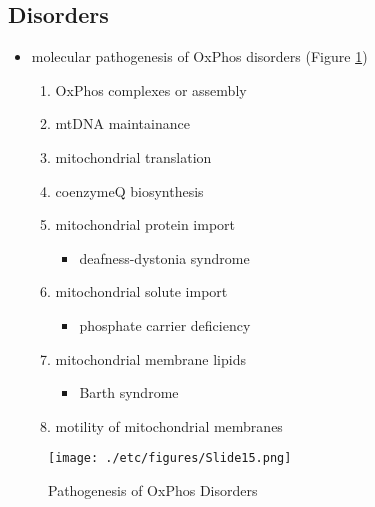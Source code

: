 \documentclass{scrartcl}
\begin{document}
\subsection{Disorders}
\label{sec:orgf44757f}
\begin{itemize}
\item molecular pathogenesis of OxPhos disorders (Figure \ref{fig:org3e060f9})
\begin{enumerate}
\item OxPhos complexes or assembly
\item mtDNA maintainance
\item mitochondrial translation
\item coenzymeQ biosynthesis
\item mitochondrial protein import
\begin{itemize}
\item deafness-dystonia syndrome
\end{itemize}
\item mitochondrial solute import
\begin{itemize}
\item phosphate carrier deficiency
\end{itemize}
\item mitochondrial membrane lipids
\begin{itemize}
\item Barth syndrome
\end{itemize}
\item motility of mitochondrial membranes
\end{enumerate}
\end{itemize}

\begin{figure}[htbp]
\centering
\texttt{[image: ./etc/figures/Slide15.png]}
\caption[ETC]{\label{fig:org3e060f9}
Pathogenesis of OxPhos Disorders}
\end{figure}
\end{document}
